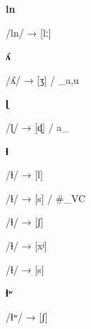 \begin{center}\textbf{ln}\end{center}
\begin{multicols}{4}
\noindent /ln/ → [lː]

\end{multicols}

\begin{center}\textbf{ʎ}\end{center}
\begin{multicols}{4}
\noindent /ʎ/ → [ʒ] / \_{a,u}

\end{multicols}

\begin{center}\textbf{ɭ}\end{center}
\begin{multicols}{4}
\noindent /ɭ/ → [ɖ] / a\_

\end{multicols}

\begin{center}\textbf{ɬ}\end{center}
\begin{multicols}{4}
\noindent /ɬ/ → [l]

\noindent /ɬ/ → [s] / \#\_VC

\noindent /ɬ/ → [ʃ]

\noindent /ɬ/ → [xʲ]

\noindent /ɬ/ → [s]

\end{multicols}

\begin{center}\textbf{ɬʷ}\end{center}
\begin{multicols}{4}
\noindent /ɬʷ/ → [ʃ]

\end{multicols}

